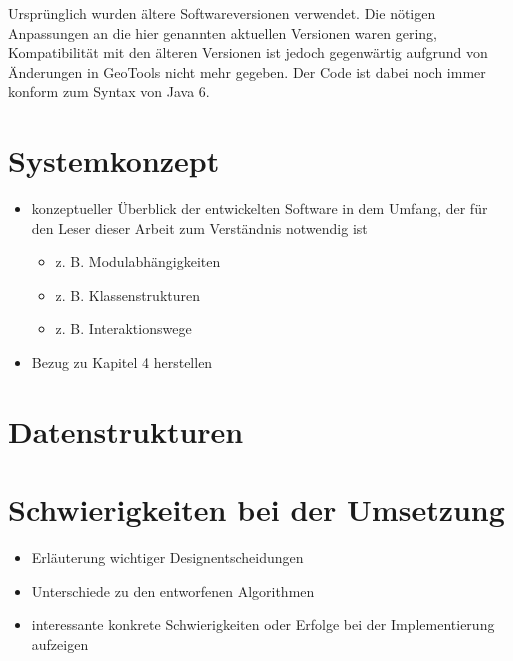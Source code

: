 \documentclass[../main/thesis.tex]{subfiles}
\begin{document}
Ursprünglich wurden ältere Softwareversionen verwendet.
Die nötigen Anpassungen an die hier genannten aktuellen Versionen waren gering, Kompatibilität mit den älteren Versionen ist jedoch gegenwärtig aufgrund von Änderungen in GeoTools nicht mehr gegeben.
Der Code ist dabei noch immer konform zum Syntax von Java 6. 



\section{Systemkonzept}

\begin{itemize}
	\item konzeptueller Überblick der entwickelten Software in dem Umfang, der für den Leser dieser Arbeit zum Verständnis notwendig ist
	\begin{itemize}
		\item z. B. Modulabhängigkeiten
		\item z. B. Klassenstrukturen
		\item z. B. Interaktionswege
	\end{itemize}
	\item Bezug zu Kapitel 4 herstellen
\end{itemize}



\section{Datenstrukturen}
\label{ch:data-structures}



\section{Schwierigkeiten bei der Umsetzung}
\label{ch:impl-difficulties}

\begin{itemize}
	\item Erläuterung wichtiger Designentscheidungen
	\item Unterschiede zu den entworfenen Algorithmen
	\item interessante konkrete Schwierigkeiten oder Erfolge bei der Implementierung aufzeigen
\end{itemize}


\end{document}
